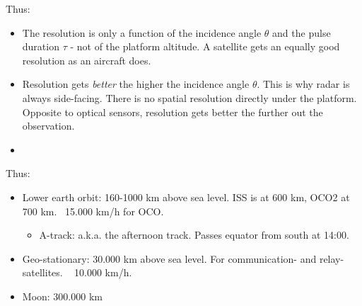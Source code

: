 Thus:
\begin{itemize}
    \item The resolution is only a function of the incidence angle $\theta$ and the pulse duration $\tau$ - not of the platform altitude. A satellite gets an equally good resolution as an aircraft does.
    \item Resolution gets \emph{better} the higher the incidence angle $\theta$. This is why radar is always side-facing. There is no spatial resolution directly under the platform. Opposite to optical sensors, resolution gets better the further out the observation.
    \item 
\end{itemize}

Thus:
\begin{itemize}
    \item Lower earth orbit: 160-1000 km above sea level. ISS is at 600 km, OCO2 at 700 km. ~15.000 km/h for OCO. \begin{itemize}
        \item A-track: a.k.a. the afternoon track. Passes equator from south at 14:00.
    \end{itemize}
    \item Geo-stationary: 30.000 km above sea level. For communication- and relay-satellites. ~ 10.000 km/h.
    \item Moon: 300.000 km
\end{itemize}


